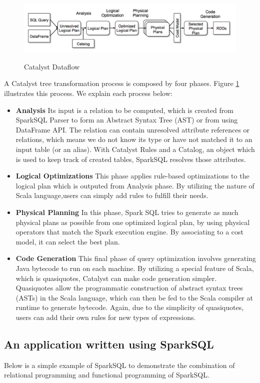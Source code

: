 \begin{figure}
\includegraphics[width=\textwidth]{Figures/catalyst-flow.png}
\label{fig:catalyst}
\caption{Catalyst Dataflow}
\end{figure}

A Catalyst tree transformation process is composed by four phases. Figure \ref{fig:catalyst} illustrates this process. We explain each process below:
\begin{itemize}
\item \textbf{Analysis} Its input is a relation to be computed, which is created from SparkSQL Parser to form an Abstract Syntax Tree (AST) or from using DataFrame API. The relation can contain unresolved attribute references or relations, which means we do not know its type or have not matched it to an input table (or an alias). With Catalyst Rules and a Catalog, an object which is used to keep track of created tables, SparkSQL resolves those attributes.
\item \textbf{Logical Optimizations} This phase applies rule-based optimizations to the logical plan which is outputed from Analysis phase. By utilizing the nature of Scala language,users can simply add rules to fulfill their needs.
\item \textbf{Physical Planning} In this phase, Spark SQL tries to generate as much physical plans as possible from one optimized logical plan, by using physical operators that match the Spark execution engine. By associating to a cost model, it can select the best plan.
\item \textbf{Code Generation} This final phase of query optimization involves generating Java bytecode to run on each machine. By utilizing a special feature of Scala, which is quasiquotes, Catalyst can make code generation simpler. Quasiquotes allow the programmatic construction of abstract syntax trees (ASTs) in the Scala language, which can then be fed to the Scala compiler at runtime to generate bytecode. Again, due to the simplicity of quasiquotes, users can add their own rules for new types of expressions.
\end{itemize}
\subsection{An application written using SparkSQL}
Below is a simple example of SparkSQL to demonstrate the combination of relational programming and functional programming of SparkSQL.\\

